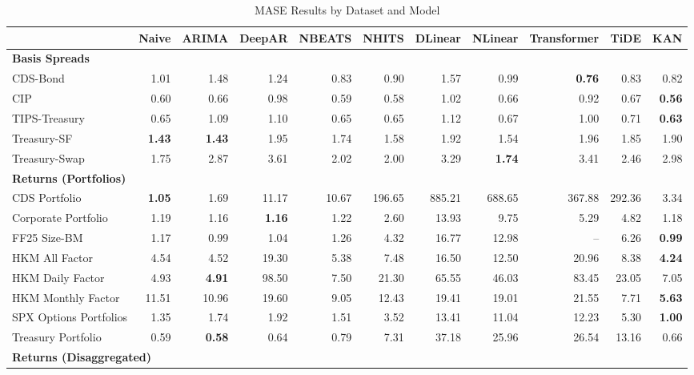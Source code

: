 
\begin{table}[htbp]
\centering
\caption{MASE Results by Dataset and Model}
\label{tab:mase_results}
\scriptsize
\setlength{\tabcolsep}{1.5pt}
\renewcommand{\arraystretch}{0.9}
\begin{tabular}{@{}lrrrrrrrrrr@{}}
\toprule
 & Naive & ARIMA & DeepAR & NBEATS & NHITS & DLinear & NLinear & Transformer & TiDE & KAN \\
\midrule
\multicolumn{11}{l}{\textbf{Basis Spreads}} \\
CDS-Bond & 1.01 & 1.48 & 1.24 & 0.83 & 0.90 & 1.57 & 0.99 & \textbf{0.76} & 0.83 & 0.82 \\
CIP & 0.60 & 0.66 & 0.98 & 0.59 & 0.58 & 1.02 & 0.66 & 0.92 & 0.67 & \textbf{0.56} \\
TIPS-Treasury & 0.65 & 1.09 & 1.10 & 0.65 & 0.65 & 1.12 & 0.67 & 1.00 & 0.71 & \textbf{0.63} \\
Treasury-SF & \textbf{1.43} & \textbf{1.43} & 1.95 & 1.74 & 1.58 & 1.92 & 1.54 & 1.96 & 1.85 & 1.90 \\
Treasury-Swap & 1.75 & 2.87 & 3.61 & 2.02 & 2.00 & 3.29 & \textbf{1.74} & 3.41 & 2.46 & 2.98 \\
\midrule
\multicolumn{11}{l}{\textbf{Returns (Portfolios)}} \\
CDS Portfolio & \textbf{1.05} & 1.69 & 11.17 & 10.67 & 196.65 & 885.21 & 688.65 & 367.88 & 292.36 & 3.34 \\
Corporate Portfolio & 1.19 & 1.16 & \textbf{1.16} & 1.22 & 2.60 & 13.93 & 9.75 & 5.29 & 4.82 & 1.18 \\
FF25 Size-BM & 1.17 & 0.99 & 1.04 & 1.26 & 4.32 & 16.77 & 12.98 & -- & 6.26 & \textbf{0.99} \\
HKM All Factor & 4.54 & 4.52 & 19.30 & 5.38 & 7.48 & 16.50 & 12.50 & 20.96 & 8.38 & \textbf{4.24} \\
HKM Daily Factor & 4.93 & \textbf{4.91} & 98.50 & 7.50 & 21.30 & 65.55 & 46.03 & 83.45 & 23.05 & 7.05 \\
HKM Monthly Factor & 11.51 & 10.96 & 19.60 & 9.05 & 12.43 & 19.41 & 19.01 & 21.55 & 7.71 & \textbf{5.63} \\
SPX Options Portfolios & 1.35 & 1.74 & 1.92 & 1.51 & 3.52 & 13.41 & 11.04 & 12.23 & 5.30 & \textbf{1.00} \\
Treasury Portfolio & 0.59 & \textbf{0.58} & 0.64 & 0.79 & 7.31 & 37.18 & 25.96 & 26.54 & 13.16 & 0.66 \\
\midrule
\multicolumn{11}{l}{\textbf{Returns (Disaggregated)}} \\

\end{tabular}
\end{table}
